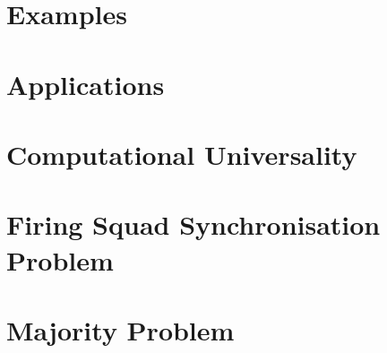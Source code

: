 \documentclass[11pt,a4paper]{article}
\begin{document}
\section{}
\section{Examples}
\section{Applications}
\section{Computational Universality}
\section{Firing Squad Synchronisation Problem}
\section{Majority Problem}
\section{}


\end{document}
